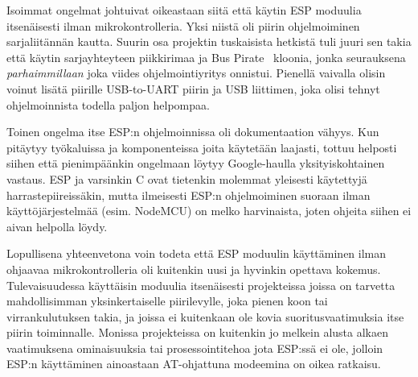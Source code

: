 Isoimmat ongelmat johtuivat oikeastaan siitä että käytin ESP moduulia
itsenäisesti ilman mikrokontrolleria. Yksi niistä oli piirin ohjelmoiminen
sarjaliitännän kautta. Suurin osa projektin tuskaisista hetkistä tuli juuri sen
takia että käytin sarjayhteyteen piikkirimaa ja Bus Pirate~\cite{buspirate}
kloonia, jonka seurauksena \textit{parhaimmillaan} joka viides
ohjelmointiyritys onnistui. Pienellä vaivalla olisin voinut lisätä piirille
USB-to-UART piirin ja USB liittimen, joka olisi tehnyt ohjelmoinnista todella
paljon helpompaa.

Toinen ongelma itse ESP:n ohjelmoinnissa oli dokumentaation vähyys. Kun
pitäytyy työkaluissa ja komponenteissa joita käytetään laajasti, tottuu
helposti siihen että pienimpäänkin ongelmaan löytyy Google-haulla
yksityiskohtainen vastaus. ESP ja varsinkin C ovat tietenkin molemmat yleisesti
käytettyjä harrastepiireissäkin, mutta ilmeisesti ESP:n ohjelmoiminen suoraan
ilman käyttöjärjestelmää (esim. NodeMCU) on melko harvinaista, joten ohjeita
siihen ei aivan helpolla löydy.

Lopullisena yhteenvetona voin todeta että ESP moduulin käyttäminen ilman
ohjaavaa mikrokontrolleria oli kuitenkin uusi ja hyvinkin opettava kokemus.
Tulevaisuudessa käyttäisin moduulia itsenäisesti projekteissa joissa on
tarvetta mahdollisimman yksinkertaiselle piirilevylle, joka pienen koon tai
virrankulutuksen takia, ja joissa ei kuitenkaan ole kovia suoritusvaatimuksia
itse piirin toiminnalle. Monissa projekteissa on kuitenkin jo melkein alusta
alkaen vaatimuksena ominaisuuksia tai prosessointitehoa jota ESP:ssä ei ole,
jolloin ESP:n käyttäminen ainoastaan AT-ohjattuna modeemina on oikea ratkaisu.








